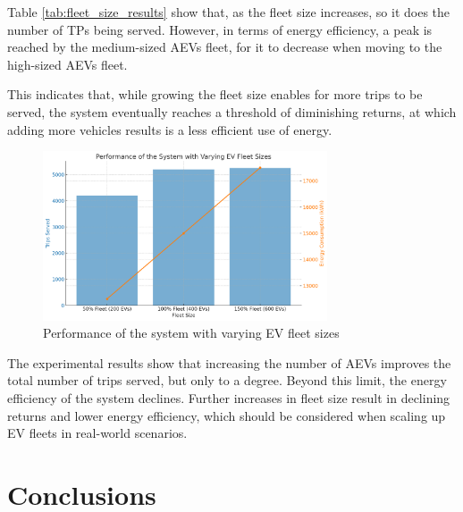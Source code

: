 Table \ref{tab:fleet_size_results} show that, as the fleet size increases, so it does the number of TPs being served. However, in terms of energy efficiency, a peak is reached by the medium-sized AEVs fleet, for it to decrease when moving to the high-sized AEVs fleet.

This indicates that, while growing the fleet size enables for more trips to be served, the system eventually reaches a threshold of diminishing returns, at which adding more vehicles results is a less efficient use of energy.

\begin{figure}[htbp]
    \centering
    \includegraphics[width=0.75\textwidth]{Crest/Images/fleet_size_performance.png}
    \caption{Performance of the system with varying EV fleet sizes}
    \label{fig:fleet_size_performance}
\end{figure}


The experimental results show that increasing the number of AEVs improves the total number of trips served, but only to a degree. Beyond this limit, the energy efficiency of the system declines. Further increases in fleet size result in declining returns and lower energy efficiency, which should be considered when scaling up EV fleets in real-world scenarios.

\section{Conclusions}
\label{sec:conclusion}

